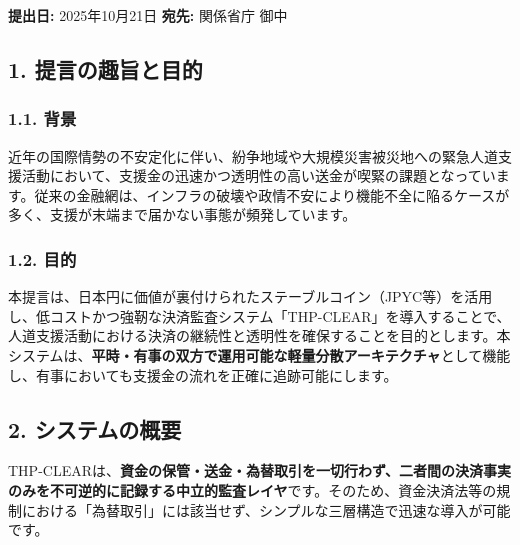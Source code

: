 \documentclass[
  a4paper,
  ja=standard,
  xelatex]{bxjsarticle}
\begin{document}
\textbf{提出日:} 2025年10月21日 \textbf{宛先:} 関係省庁 御中

\subsection{\texorpdfstring{\textbf{1.
提言の趣旨と目的}}{1. 提言の趣旨と目的}}\label{ux63d0ux8a00ux306eux8da3ux65e8ux3068ux76eeux7684}

\subsubsection{\texorpdfstring{\textbf{1.1.
背景}}{1.1. 背景}}\label{ux80ccux666f}

近年の国際情勢の不安定化に伴い、紛争地域や大規模災害被災地への緊急人道支援活動において、支援金の迅速かつ透明性の高い送金が喫緊の課題となっています。従来の金融網は、インフラの破壊や政情不安により機能不全に陥るケースが多く、支援が末端まで届かない事態が頻発しています。

\subsubsection{\texorpdfstring{\textbf{1.2.
目的}}{1.2. 目的}}\label{ux76eeux7684}

本提言は、日本円に価値が裏付けられたステーブルコイン（JPYC等）を活用し、低コストかつ強靭な決済監査システム「THP-CLEAR」を導入することで、人道支援活動における決済の継続性と透明性を確保することを目的とします。本システムは、\textbf{平時・有事の双方で運用可能な軽量分散アーキテクチャ}として機能し、有事においても支援金の流れを正確に追跡可能にします。

\subsection{\texorpdfstring{\textbf{2.
システムの概要}}{2. システムの概要}}\label{ux30b7ux30b9ux30c6ux30e0ux306eux6982ux8981}

THP-CLEARは、\textbf{資金の保管・送金・為替取引を一切行わず、二者間の決済事実のみを不可逆的に記録する中立的監査レイヤ}です。そのため、資金決済法等の規制における「為替取引」には該当せず、シンプルな三層構造で迅速な導入が可能です。
\end{document}
